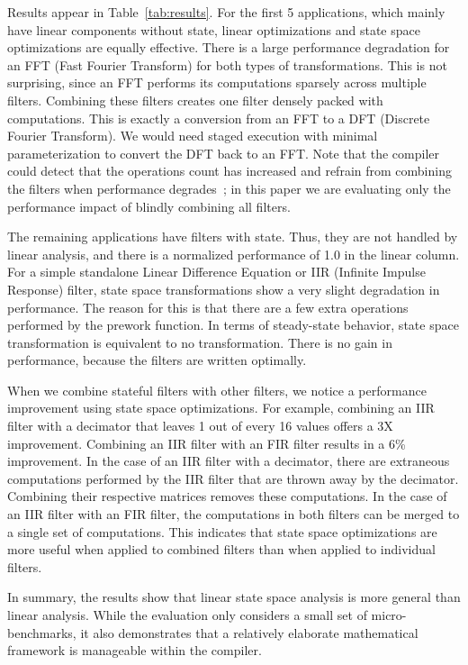 Results appear in Table~\ref{tab:results}.  For the first 5
applications, which mainly have linear components without state,
linear optimizations and state space optimizations are equally
effective. There is a large performance degradation for an FFT (Fast
Fourier Transform) for both types of transformations. This is not
surprising, since an FFT performs its computations sparsely across
multiple filters. Combining these filters creates one filter densely
packed with computations. This is exactly a conversion from an FFT to
a DFT (Discrete Fourier Transform).  We would need staged execution
with minimal parameterization to convert the DFT back to an FFT.  Note
that the compiler could detect that the operations count has increased
and refrain from combining the filters when performance
degrades~\cite{Lamb}; in this paper we are evaluating only the
performance impact of blindly combining all filters.

The remaining applications have filters with state.  Thus, they are
not handled by linear analysis, and there is a normalized performance
of 1.0 in the linear column.  For a simple standalone Linear
Difference Equation or IIR (Infinite Impulse Response) filter,
state space transformations show a very slight degradation in
performance. The reason for this is that there are a few extra
operations performed by the prework function. In terms of steady-state
behavior, state space transformation is equivalent to no
transformation. There is no gain in performance, because the filters
are written optimally.

When we combine stateful filters with other filters, we notice a
performance improvement using state space optimizations. For example,
combining an IIR filter with a decimator that leaves 1 out of every 16
values offers a 3X improvement. Combining an IIR filter with an FIR
filter results in a 6\% improvement. In the case of an IIR filter with
a decimator, there are extraneous computations performed by the IIR
filter that are thrown away by the decimator.  Combining their
respective matrices removes these computations. In the case of an IIR
filter with an FIR filter, the computations in both filters can be
merged to a single set of computations. This indicates that state
space optimizations are more useful when applied to combined filters
than when applied to individual filters.

In summary, the results show that linear state space analysis is more
general than linear analysis.  While the evaluation only considers a
small set of micro-benchmarks, it also demonstrates that a relatively
elaborate mathematical framework is manageable within the compiler.
